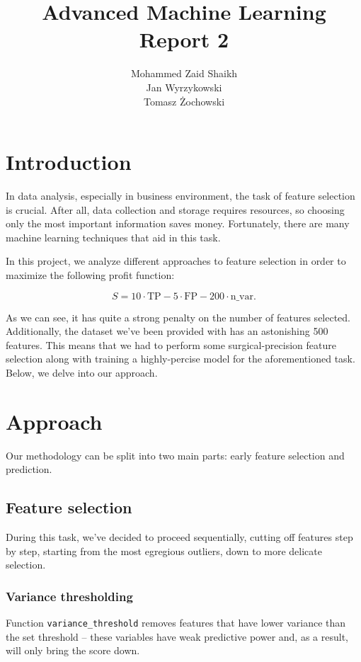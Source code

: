 \documentclass{article}
\title{Advanced Machine Learning\\Report 2}
\author{Mohammed Zaid Shaikh\\Jan Wyrzykowski\\Tomasz Żochowski}
\begin{document}
\maketitle
\tableofcontents
\newpage

\section{Introduction}

In data analysis, especially in business environment, the task of feature selection is crucial. After all, data collection and storage requires resources, so choosing only the most important information saves money. Fortunately, there are many machine learning techniques that aid in this task.

In this project, we analyze different approaches to feature selection in order to maximize the following profit function:

$$S = 10 \cdot \mathrm{TP} - 5 \cdot \mathrm{FP} - 200 \cdot \mathrm{n\_var}.$$

As we can see, it has quite a strong penalty on the number of features selected. Additionally, the 
dataset we've been provided with has an astonishing 500 features. This means that we had to perform some surgical-precision feature selection
along with training a highly-percise model for the aforementioned task. Below, we delve into our approach.

\section{Approach}

Our methodology can be split into two main parts: early feature selection and prediction.

\subsection{Feature selection}

During this task, we've decided to proceed sequentially, cutting off features step by step, starting from the most egregious outliers, down to more delicate selection.


\subsubsection{Variance thresholding}

Function \verb|variance_threshold| removes features that have lower variance than the set threshold -- these variables have weak predictive power and, as a result, will only bring the score down.
\end{document}
